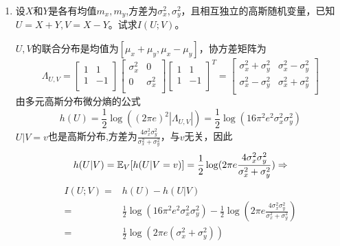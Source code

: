 \documentclass[a4paper]{article}
\begin{document}
\courseheader
{}

\begin{enumerate}[label=\thehwcnt.\arabic*.]
  \setlength{\itemsep}{3\parskip}

  \item 设$X$和$Y$是各有均值$m_x,m_y$,方差为$\sigma_x^2,\sigma_y^2$，且相互独立的高斯随机变量，已知$U=X+Y,V=X-Y$。试求$I(U;V)$。
\begin{solution}
$U,V$的联合分布是均值为$[\mu_x+\mu_y,\mu_x-\mu_y]$，协方差矩阵为
$$\Lambda_{U,V}=\begin{bmatrix}
1 & 1\\
1 & -1\\
\end{bmatrix}
\begin{bmatrix}
\sigma_x^2 & 0\\
0 & \sigma_x^2\\
\end{bmatrix}
\begin{bmatrix}
1 & 1\\
1 & -1\\
\end{bmatrix}^T
=\begin{bmatrix}
\sigma_x^2+\sigma_y^2 & \sigma_x^2-\sigma_y^2\\
\sigma_x^2-\sigma_y^2 & \sigma_x^2+\sigma_y^2\\
\end{bmatrix}
$$
由多元高斯分布微分熵的公式
$$
h(U)=\frac{1}{2}\log ((2\pi e)^2 |\Lambda_{U,V}|)=\frac{1}{2}\log(16\pi^2 e^2 \sigma^2_x\sigma^2_y)
$$
$U|V=v$也是高斯分布,方差为$\frac{4\sigma_x^2\sigma_y^2}{\sigma_x^2+\sigma_y^2}$，与$v$无关，因此
$$
h(U|V)=\operatorname{\mathbb{E}}_{V}[h(U|V=v)]=\frac{1}{2}\log(2\pi e \frac{4\sigma_x^2\sigma_y^2}{\sigma_x^2+\sigma_y^2})\Rightarrow
$$
\begin{align*}
I(U;V)=& h(U)-h(U|V)\\
=&\frac{1}{2}\log(16\pi^2 e^2 \sigma^2_x\sigma^
2_y)-\frac{1}{2}\log(2\pi e \frac{4\sigma_x^2\sigma_y^2}{\sigma_x^2+\sigma_y^2})\\
=&\frac{1}{2}\log(2\pi e (\sigma_x^2+\sigma_y^2))
\end{align*}



\end{solution}
\end{enumerate}
\end{document}
